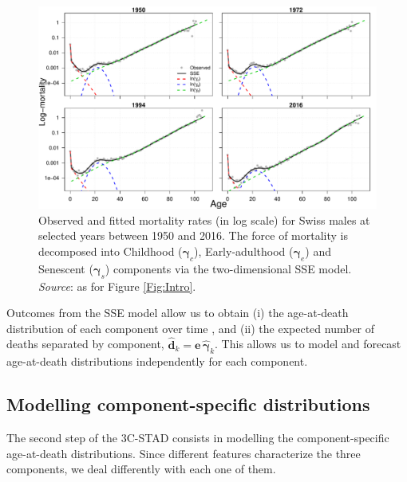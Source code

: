 \documentclass[11pt, a4paper]{article}
\begin{document}
\begin{figure}[t]
	\begin{center}
		\includegraphics[scale=0.62]{./Figures/F2.pdf}
		\caption{Observed and fitted mortality rates (in log scale) for Swiss males at selected years between 1950 and 2016. The force of mortality is decomposed into Childhood ($\bm{\gamma}_c$), Early-adulthood ($\bm{\gamma}_e$) and Senescent ($\bm{\gamma}_s$) components via the two-dimensional SSE model.\\\footnotesize{\textit{Source}: as for Figure \ref{Fig:Intro}.} \label{Fig:SSEexample}}		
	\end{center}
\end{figure}

Outcomes from the SSE model allow us to obtain (i) the age-at-death distribution of each component over time {\color{red} \cite[using standard life-table construction,][]{preston2001demogr}}, and (ii) the expected number of deaths separated by component, $\hat{\bm{d}}_k=\bm{e}\,\hat{\bm{\gamma}}_k$. This allows us to model and forecast age-at-death distributions independently for each component. 


\subsection{Modelling component-specific distributions}\label{Subsec:STADbyComp}

The second step of the 3C-STAD consists in modelling the component-specific age-at-death distributions. Since different features characterize the three components, we deal differently with each one of them. 
\end{document}
